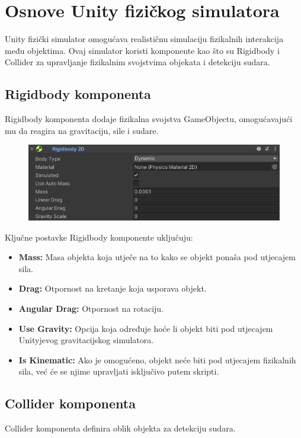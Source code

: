\documentclass[diplomskirad]{fer}
\begin{document}
    \section{Osnove Unity fizičkog simulatora}\label{sec:osnove-unity-fizickog-simulatora}

    Unity fizički simulator omogućava realističnu simulaciju fizikalnih interakcija među objektima.
    Ovaj simulator koristi komponente kao što su Rigidbody i Collider za upravljanje fizikalnim svojstvima objekata i detekciju sudara.

    \subsection{Rigidbody komponenta}\label{subsec:rigidbody-komponenta}
    Rigidbody komponenta dodaje fizikalna svojstva GameObjectu, omogućavajući mu da reagira na gravitaciju, sile i sudare.

    \begin{figure}[H]
        \centering
        \includegraphics[scale=0.5]{images/rigidBody}
        \label{fig:rigidBody}
    \end{figure}

    Ključne postavke Rigidbody komponente uključuju:
    \begin{itemize}
        \item \textbf{Mass:} Masa objekta koja utječe na to kako se objekt ponaša pod utjecajem sila.
        \item \textbf{Drag:} Otpornost na kretanje koja usporava objekt.
        \item \textbf{Angular Drag:} Otpornost na rotaciju.
        \item \textbf{Use Gravity:} Opcija koja određuje hoće li objekt biti pod utjecajem Unityjevog gravitacijskog simulatora.
        \item \textbf{Is Kinematic:} Ako je omogućeno, objekt neće biti pod utjecajem fizikalnih sila, već će se njime upravljati isključivo putem skripti.
    \end{itemize}

    \subsection{Collider komponenta}\label{subsec:collider-komponenta}
    Collider komponenta definira oblik objekta za detekciju sudara.
\end{document}
